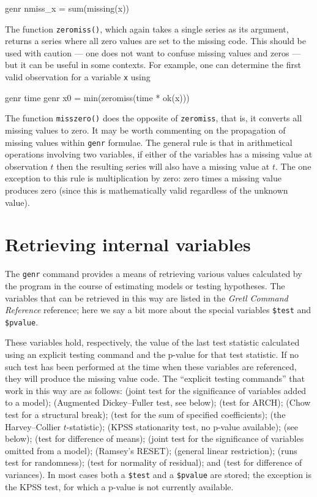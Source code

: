 \begin{code}
      genr nmiss_x = sum(missing(x))
\end{code}

The function \verb+zeromiss()+, which again takes a single series as
its argument, returns a series where all zero values are set to the
missing code.  This should be used with caution --- one does not want
to confuse missing values and zeros --- but it can be useful in some
contexts.  For example, one can determine the first valid observation
for a variable \verb+x+ using

\begin{code}
      genr time
      genr x0 = min(zeromiss(time * ok(x)))
\end{code}

The function \verb+misszero()+ does the opposite of \verb+zeromiss+,
that is, it converts all missing values to zero.  It may be worth
commenting on the propagation of missing values within \verb+genr+
formulae.  The general rule is that in arithmetical operations
involving two variables, if either of the variables has a missing
value at observation $t$ then the resulting series will also have a
missing value at $t$.  The one exception to this rule is
multiplication by zero: zero times a missing value produces zero
(since this is mathematically valid regardless of the unknown value).
    

\section{Retrieving internal variables}
\label{genr-internal}

The \verb+genr+ command provides a means of retrieving various values
calculated by the program in the course of estimating models or
testing hypotheses.  The variables that can be retrieved in this way
are listed in the \emph{Gretl Command Reference} reference; here we
say a bit more about the special variables \verb+$test+ and
\verb+$pvalue+.

These variables hold, respectively, the value of the last test
statistic calculated using an explicit testing command and the p-value
for that test statistic.  If no such test has been performed at the
time when these variables are referenced, they will produce the
missing value code.  The ``explicit testing commands'' that work in
this way are as follows:  (joint test for the significance of
variables added to a model);  (Augmented Dickey--Fuller test,
see below);  (test for ARCH);  (Chow test for a
structural break);  (test for the sum of specified
coefficients);  (the Harvey--Collier $t$-statistic);
 (KPSS stationarity test, no p-value available);
 (see below);  (test for difference of
means);  (joint test for the significance of variables
omitted from a model);  (Ramsey's RESET); 
(general linear restriction);  (runs test for randomness);
 (test for normality of residual); and 
(test for difference of variances). In most cases both a \verb+$test+
and a \verb+$pvalue+ are stored; the exception is the KPSS test, for
which a p-value is not currently available.
    
